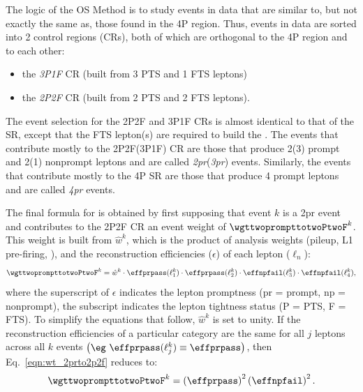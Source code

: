 The logic of the OS Method is to study events in data that are similar to, but not exactly the same as, those found in the 4P region.
Thus, events in data are sorted into 2 control regions (CRs), both of which are orthogonal to the 4P region and to each other:
\begin{itemize}
	\item the \emph{3P1F} CR (built from 3 PTS and 1 FTS leptons)
	\item the \emph{2P2F} CR (built from 2 PTS and 2 FTS leptons).
\end{itemize}
The event selection for the 2P2F and 3P1F CRs is almost identical to that of the SR, %
except that the FTS lepton(s) are required to build the \Ztwo.
The events that contribute mostly to the 2P2F(3P1F) CR are those that produce 2(3) prompt and 2(1) nonprompt leptons and are called \emph{2pr}(\emph{3pr}) events.
Similarly, the events that contribute mostly to the 4P SR are those that produce 4 prompt leptons and are called \emph{4pr} events.

The final formula for \nfourPRB is obtained by first supposing that event $k$ is a 2pr event and contributes to the 2P2F CR an event weight of $\wgttwoprompttotwoPtwoF^k$.
This weight is built from $\hat{w}^k$, which is the product of analysis weights (pileup, L1 pre-firing, \etc), and the reconstruction efficiencies ($\epsilon$) of each lepton ($\ell_n$):
\begin{equation}
	\label{eqn:wt_2prto2p2f}
	\wgttwoprompttotwoPtwoF^k = \hat{w}^k \cdot \effprpass(\ell_1^k) \cdot \effprpass(\ell_2^k) \cdot \effnpfail(\ell_3^k) \cdot \effnpfail(\ell_4^k),
\end{equation}
where the superscript of $\epsilon$ indicates the lepton promptness (pr = prompt, np = nonprompt),
the subscript indicates the lepton tightness status (P = PTS, F = FTS).
To simplify the equations that follow, $\hat{w}^k$ is set to unity.
If the reconstruction efficiencies of a particular category are the same for all $j$ leptons across all $k$ events $\left( \eg ~ \effprpass(\ell_j^k) \equiv \effprpass \right)$, then Eq.~\ref{eqn:wt_2prto2p2f} reduces to:
\begin{equation}
	\label{eqn:wt_2prto2p2f_simp}
	\wgttwoprompttotwoPtwoF^k = 
	\left( \effprpass \right)^2 
	\left( \effnpfail \right)^2.
\end{equation}

